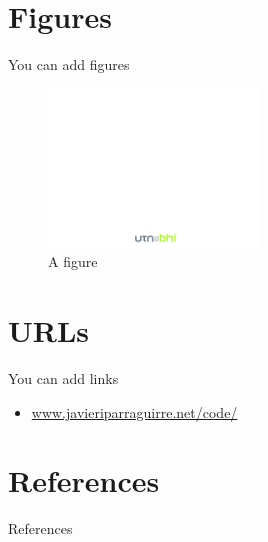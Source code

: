 \documentclass[]{beamer}
\begin{document}
\section{Figures}
\begin{frame}{You can add figures}
  \begin{figure}
    \includegraphics[width=0.5\textwidth]{theme/utn-bhi-page} 
    \caption{A figure}
  \end{figure}
\end{frame}

\section{URLs}
\begin{frame}{You can add links}
  \begin{itemize}
    \item \small{\url{www.javieriparraguirre.net/code/}}
  \end{itemize}
\end{frame}

{
\section{References}
\begin{frame}[allowframebreaks]{References}
  
  
\end{frame}
}
\end{document}

